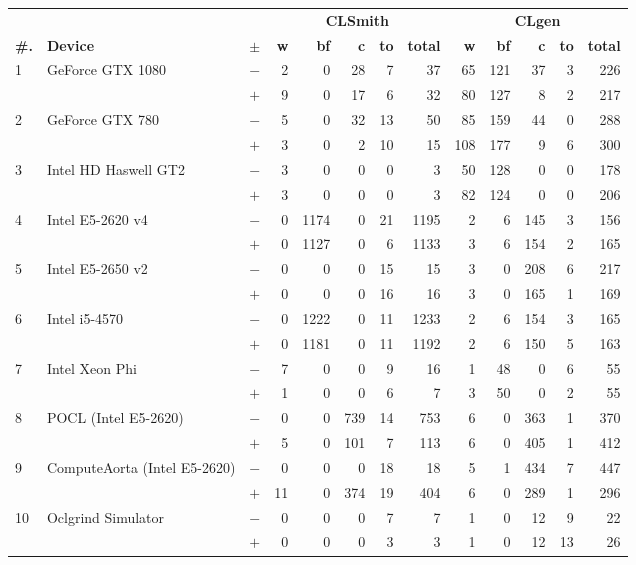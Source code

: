   \begin{tabular}{lll | rrrrr | rrrrr }
  \toprule
  & & & \multicolumn{5}{c|}{\textbf{CLSmith}} & \multicolumn{5}{c}{\textbf{CLgen}} \\
  \textbf{\#.} & \textbf{Device} & $\pm$ &
  \textbf{w} & \textbf{bf} & \textbf{c} & \textbf{to} & \textbf{total} &
  \textbf{w} & \textbf{bf} & \textbf{c} & \textbf{to} & \textbf{total} \\
  \midrule
  \multirow{ 2}{*}{1} & \multirow{ 2}{*}{GeForce GTX 1080} & $-$ & 2 & 0 & 28 & 7 & 37       & 65 & 121 & 37 & 3 & 226 \\& & $+$ & 9 & 0 & 17 & 6 & 32 & 80 & 127 & 8 & 2 & 217 \\
\hline
\multirow{ 2}{*}{2} & \multirow{ 2}{*}{GeForce GTX 780} & $-$ & 5 & 0 & 32 & 13 & 50       & 85 & 159 & 44 & 0 & 288 \\& & $+$ & 3 & 0 & 2 & 10 & 15 & 108 & 177 & 9 & 6 & 300 \\
\hline
\multirow{ 2}{*}{3} & \multirow{ 2}{*}{Intel HD Haswell GT2} & $-$ & 3 & 0 & 0 & 0 & 3       & 50 & 128 & 0 & 0 & 178 \\& & $+$ & 3 & 0 & 0 & 0 & 3 & 82 & 124 & 0 & 0 & 206 \\
\hline
\multirow{ 2}{*}{4} & \multirow{ 2}{*}{Intel E5-2620 v4} & $-$ & 0 & 1174 & 0 & 21 & 1195       & 2 & 6 & 145 & 3 & 156 \\& & $+$ & 0 & 1127 & 0 & 6 & 1133 & 3 & 6 & 154 & 2 & 165 \\
\hline
\multirow{ 2}{*}{5} & \multirow{ 2}{*}{Intel E5-2650 v2} & $-$ & 0 & 0 & 0 & 15 & 15       & 3 & 0 & 208 & 6 & 217 \\& & $+$ & 0 & 0 & 0 & 16 & 16 & 3 & 0 & 165 & 1 & 169 \\
\hline
\multirow{ 2}{*}{6} & \multirow{ 2}{*}{Intel i5-4570} & $-$ & 0 & 1222 & 0 & 11 & 1233       & 2 & 6 & 154 & 3 & 165 \\& & $+$ & 0 & 1181 & 0 & 11 & 1192 & 2 & 6 & 150 & 5 & 163 \\
\hline
\multirow{ 2}{*}{7} & \multirow{ 2}{*}{Intel Xeon Phi} & $-$ & 7 & 0 & 0 & 9 & 16       & 1 & 48 & 0 & 6 & 55 \\& & $+$ & 1 & 0 & 0 & 6 & 7 & 3 & 50 & 0 & 2 & 55 \\
\hline
\multirow{ 2}{*}{8} & \multirow{ 2}{*}{POCL (Intel E5-2620)} & $-$ & 0 & 0 & 739 & 14 & 753       & 6 & 0 & 363 & 1 & 370 \\& & $+$ & 5 & 0 & 101 & 7 & 113 & 6 & 0 & 405 & 1 & 412 \\
\hline
\multirow{ 2}{*}{9} & \multirow{ 2}{*}{ComputeAorta (Intel E5-2620)} & $-$ & 0 & 0 & 0 & 18 & 18       & 5 & 1 & 434 & 7 & 447 \\& & $+$ & 11 & 0 & 374 & 19 & 404 & 6 & 0 & 289 & 1 & 296 \\
\hline
\multirow{ 2}{*}{10} & \multirow{ 2}{*}{Oclgrind Simulator} & $-$ & 0 & 0 & 0 & 7 & 7       & 1 & 0 & 12 & 9 & 22 \\& & $+$ & 0 & 0 & 0 & 3 & 3 & 1 & 0 & 12 & 13 & 26 \\
  \bottomrule
\end{tabular}

